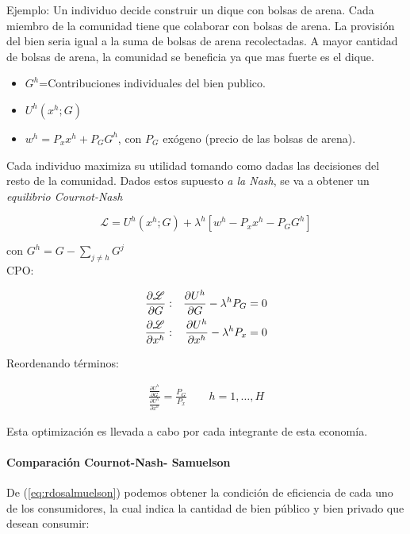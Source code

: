 Ejemplo: Un individuo decide construir un dique con bolsas de arena. Cada miembro de la comunidad tiene que colaborar con bolsas de arena. La provisión del bien seria igual a la suma de bolsas de arena recolectadas. A mayor cantidad de bolsas de arena, la comunidad se beneficia ya que mas fuerte es el dique.

\begin{itemize}
	\item $G^h$=Contribuciones individuales del bien publico.
	\item $U^h(x^h;G)$
	\item $w^h=P_x x^h+P_ G G^h$, con $P_G$ exógeno (precio de las bolsas de arena).
\end{itemize}

Cada individuo maximiza su utilidad tomando como dadas las decisiones del resto de la comunidad. Dados estos supuesto \emph{a la Nash}, se va a obtener un \emph{equilibrio Cournot-Nash}

	$$\mathscr{L}=U^h(x^h;G)+\lambda^h[w^h - P_x x^h-P_G G^h]$$
	
con $G^h = G - \sum_{j \neq h} G^j$ \\


CPO:
	
\begin{eqnarray}
	\frac{\partial \mathscr{L}}{\partial G} &:& \frac{\partial U^h}{\partial G} - \lambda^h P_G = 0 \nonumber \\
	\frac{\partial \mathscr{L}}{\partial x^h} &:& \frac{\partial U^h}{\partial x^h} - \lambda^h P_x = 0 \nonumber \label{eq:rdosalmuelson}
\end{eqnarray}

Reordenando términos: 

\begin{eqnarray}
	\frac{\frac{\partial U^h}{\partial G}}{\frac{\partial U^h}{\partial x^h}} = \frac{P_G}{P_x} \qquad h=1, \ldots, H
\end{eqnarray}

Esta optimización es llevada a cabo por cada integrante de esta economía.

\paragraph{Comparación Cournot-Nash- Samuelson}


De (\ref{eq:rdosalmuelson}) podemos obtener la condición de eficiencia de cada uno de los consumidores, la cual indica la cantidad de bien público y bien privado que desean consumir:

